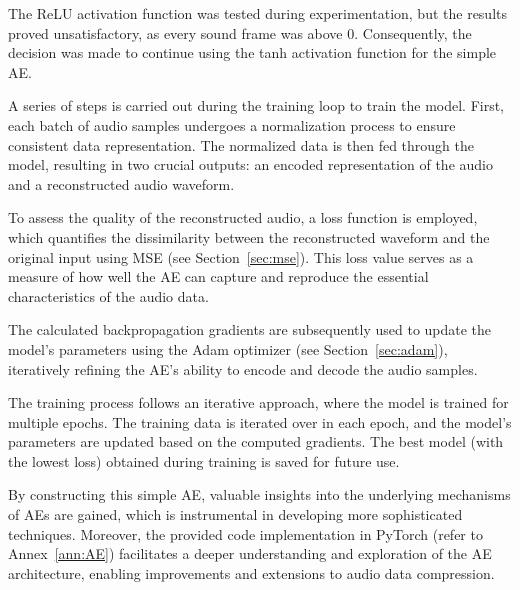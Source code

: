 The \ac{ReLU} activation function was tested during experimentation, but the results proved unsatisfactory, as every sound frame was above 0. Consequently, the decision was made to continue using the \ac{tanh} activation function for the simple \ac{AE}.

A series of steps is carried out during the training loop to train the model. First, each batch of audio samples undergoes a normalization process to ensure consistent data representation. The normalized data is then fed through the model, resulting in two crucial outputs: an encoded representation of the audio and a reconstructed audio waveform.

To assess the quality of the reconstructed audio, a loss function is employed, which quantifies the dissimilarity between the reconstructed waveform and the original input using \ac{MSE} (see Section~\ref{sec:mse}). This loss value serves as a measure of how well the \ac{AE} can capture and reproduce the essential characteristics of the audio data.

The calculated backpropagation gradients are subsequently used to update the model's parameters using the Adam optimizer (see Section~\ref{sec:adam}), iteratively refining the \ac{AE}'s ability to encode and decode the audio samples.

The training process follows an iterative approach, where the model is trained for multiple epochs. The training data is iterated over in each epoch, and the model's parameters are updated based on the computed gradients. The best model (with the lowest loss) obtained during training is saved for future use.

By constructing this simple \ac{AE}, valuable insights into the underlying mechanisms of \ac{AE}s are gained, which is instrumental in developing more sophisticated techniques. Moreover, the provided code implementation in PyTorch (refer to Annex~\ref{ann:AE}) facilitates a deeper understanding and exploration of the \ac{AE} architecture, enabling improvements and extensions to audio data compression.

